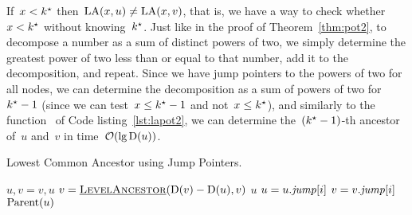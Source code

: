 \documentclass[main.tex]{subfiles}
\begin{document}
If~${x < k^\star}$ then~${\operatorname{LA}(x, u) \neq \operatorname{LA}(x, v)}$, that is, we have a way to check whether~$x < k^\star$ without knowing~$k^\star$. Just like in the proof of Theorem~\ref{thm:pot2}, to decompose a number as a sum of distinct powers of two, we simply determine the greatest power of two less than or equal to that number, add it to the decomposition, and repeat. Since we have jump pointers to the powers of two for all nodes, we can determine the decomposition as a sum of powers of two for~${k^\star - 1}$ (since we can test~${x \leq k^\star - 1}$ and not~${x \leq k^\star}$), and similarly to the function~ of Code listing~\ref{lst:lapot2}, we can determine the~\mbox{$(k^\star-1)$-th} ancestor of~$u$ and~$v$ in time~$\mathcal{O}(\lg \operatorname{D}(u))$.


\begin{algorithm}
\caption{Lowest Common Ancestor using Jump Pointers. \label{lst:lcapot2}}
\begin{algorithmic}[1]
			\State $u, v = v, u$ 
		\EndIf
		\State $v = \mbox{\textsc{\underline{LevelAncestor}}\ensuremath{(\operatorname{D}(v) - \operatorname{D}(u), v)}}$ 
		 \label{lst:lcapot2:if2}
			\State \Return $u$
		\EndIf
		 \label{lst:lcapot2:for}
			 \label{lst:lcapot2:iffor}
				\State $u = u.\mathit{jump}[i]$
				\State $v = v.\mathit{jump}[i]$
			\EndIf
		\EndFor
		\State \Return $\operatorname{Parent}(u)$
	\EndFunction
\end{algorithmic}
\end{algorithm}
\end{document}
